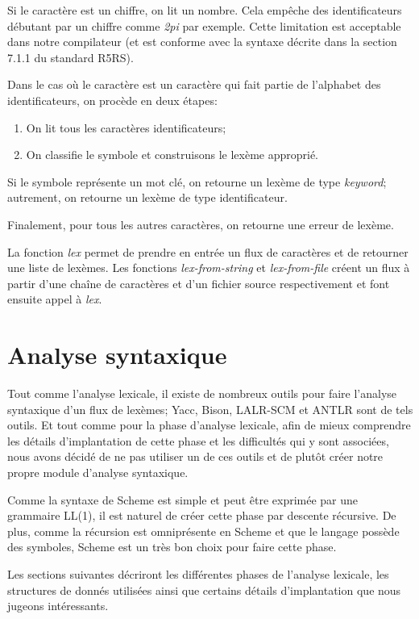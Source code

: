 \documentclass[11pt]{report}
\begin{document}
Si le caractère est un chiffre, on lit un nombre.  Cela empêche des
identificateurs débutant par un chiffre comme \emph{2pi} par exemple.
Cette limitation est acceptable dans notre compilateur (et est
conforme avec la syntaxe décrite dans la section 7.1.1 du standard
R5RS).

Dans le cas où le caractère est un caractère qui fait partie de
l'alphabet des identificateurs, on procède en deux étapes:

\begin{enumerate}
\item On lit tous les caractères identificateurs;
\item On classifie le symbole et construisons le lexème approprié.
\end{enumerate}

Si le symbole représente un mot clé, on retourne un lexème de type
\emph{keyword}; autrement, on retourne un lexème de type
identificateur.

Finalement, pour tous les autres caractères, on retourne une erreur de
lexème.

La fonction \emph{lex} permet de prendre en entrée un flux de
caractères et de retourner une liste de lexèmes.  Les fonctions
\emph{lex-from-string} et \emph{lex-from-file} créent un flux à partir
d'une chaîne de caractères et d'un fichier source respectivement et
font ensuite appel à \emph{lex}.


\chapter{Analyse syntaxique}

Tout comme l'analyse lexicale, il existe de nombreux outils pour faire
l'analyse syntaxique d'un flux de lexèmes; Yacc, Bison, LALR-SCM et
ANTLR sont de tels outils.  Et tout comme pour la phase d'analyse
lexicale, afin de mieux comprendre les détails d'implantation de cette
phase et les difficultés qui y sont associées, nous avons décidé de ne
pas utiliser un de ces outils et de plutôt créer notre propre module
d'analyse syntaxique.

Comme la syntaxe de Scheme est simple et peut être exprimée par une
grammaire LL(1), il est naturel de créer cette phase par descente
récursive.  De plus, comme la récursion est omniprésente en Scheme et
que le langage possède des symboles, Scheme est un très bon choix pour
faire cette phase.

Les sections suivantes décriront les différentes phases de l'analyse
lexicale, les structures de donnés utilisées ainsi que certains
détails d'implantation que nous jugeons intéressants.
\end{document}
